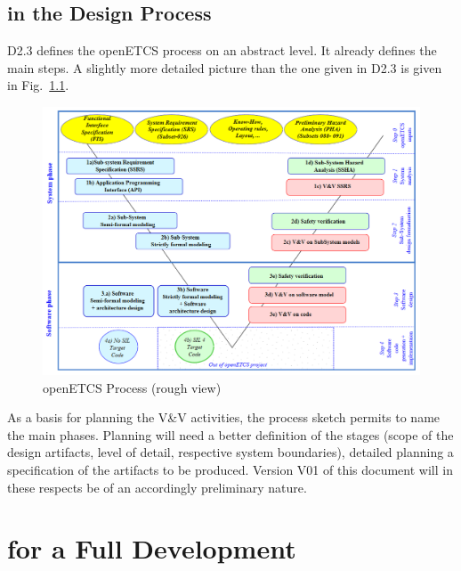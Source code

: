 \documentclass{../template/openetcs_report}
\begin{document}
\chapter{\VV in the Design Process}
\label{cha:vv-design-process}

D2.3 defines the openETCS process on an abstract level. It already
defines the main steps. A slightly more detailed picture than the one
given in D2.3 is given in Fig.~\ref{fig:openETCSProcess}. 

\begin{figure}[htb]
  \centering
  \includegraphics[width=.9\textwidth]{images/ProcessOpenETCS-BeM.png}
  \caption{openETCS Process (rough view)}
  \label{fig:openETCSProcess}
\end{figure}
%
As a basis for planning the V\&V activities, the process sketch
permits to name the main phases. Planning will need a
better definition of the stages (scope of the design artifacts,
level of detail, respective system boundaries), detailed planning a
specification of the artifacts to be produced. Version V01 of this
document will in these respects be of an accordingly preliminary
nature. 
 

\part{\VV for a Full Development }


\end{document}
